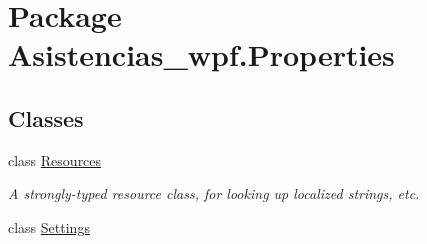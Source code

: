 \hypertarget{namespace_asistencias__wpf_1_1_properties}{\section{Package Asistencias\-\_\-wpf.\-Properties}
\label{namespace_asistencias__wpf_1_1_properties}
}
\subsection*{Classes}
\begin{DoxyCompactItemize}
\item 
class \hyperlink{class_asistencias__wpf_1_1_properties_1_1_resources}{Resources}
\begin{DoxyCompactList}\small\item\em A strongly-\/typed resource class, for looking up localized strings, etc. \end{DoxyCompactList}\item 
class \hyperlink{class_asistencias__wpf_1_1_properties_1_1_settings}{Settings}
\end{DoxyCompactItemize}
